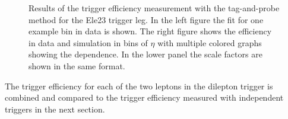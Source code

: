 \begin{figure}[htbp!]
  \begin{center}
      \caption{Results of the trigger efficiency measurement with the tag-and-probe method for the Ele23 trigger leg. In the left figure the fit for one example bin in data is shown. The right figure shows the efficiency in data and simulation in bins of $\eta$ with multiple colored graphs showing the \pt dependence. In the lower panel the scale factors are shown in the same format. }  
    \label{fig:TP_Ele23}
  \end{center}
\end{figure}

The trigger efficiency for each of the two leptons in the dilepton trigger is combined and compared to the trigger efficiency measured with independent triggers in the next section.

